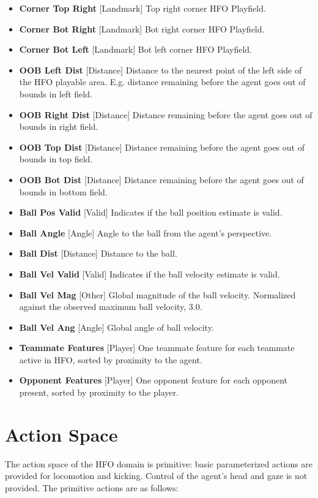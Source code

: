 \documentclass[12pt]{article}
\begin{document}
\begin{itemize}
  \item{\textbf{Corner Top Right} [Landmark] Top right corner HFO Playfield.}
  \item{\textbf{Corner Bot Right} [Landmark] Bot right corner HFO Playfield.}
  \item{\textbf{Corner Bot Left} [Landmark] Bot left corner HFO Playfield.}
  \item{\textbf{OOB Left Dist} [Distance] Distance to the nearest
    point of the left side of the HFO playable area. E.g. distance
    remaining before the agent goes out of bounds in left field.}
  \item{\textbf{OOB Right Dist} [Distance] Distance remaining before
    the agent goes out of bounds in right field.}
  \item{\textbf{OOB Top Dist} [Distance] Distance remaining before
    the agent goes out of bounds in top field.}
  \item{\textbf{OOB Bot Dist} [Distance] Distance remaining before
    the agent goes out of bounds in bottom field.}
  \item{\textbf{Ball Pos Valid} [Valid] Indicates if the ball position estimate is valid.}
  \item{\textbf{Ball Angle} [Angle] Angle to the ball from the agent's perspective.}
  \item{\textbf{Ball Dist} [Distance] Distance to the ball.}
  \item{\textbf{Ball Vel Valid} [Valid] Indicates if the ball velocity estimate is valid.}
  \item{\textbf{Ball Vel Mag} [Other] Global magnitude of the ball velocity. Normalized against the observed maximum ball velocity, 3.0.}
  \item{\textbf{Ball Vel Ang} [Angle] Global angle of ball velocity.}
  \item{\textbf{Teammate Features} [Player] One teammate feature for each teammate active in HFO, sorted by proximity to the agent.}
  \item{\textbf{Opponent Features} [Player] One opponent feature for each opponent present, sorted by proximity to the player.}
\end{itemize}

\section{Action Space}

The action space of the HFO domain is primitive: basic parameterized
actions are provided for locomotion and kicking. Control of the
agent's head and gaze is not provided. The primitive actions are as
follows:
\end{document}
